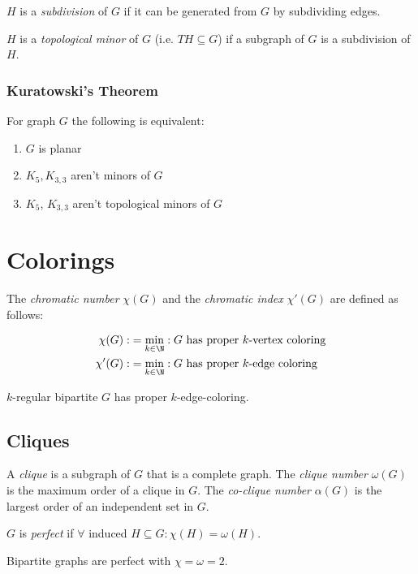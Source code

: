 $H$ is a \emph{subdivision} of $G$ if it can be generated from $G$ by subdividing edges.

$H$ is a \emph{topological minor} of $G$ (i.e. $TH \subseteq G$) if a subgraph of $G$ is a subdivision of $H$.

\subsubsection*{Kuratowski's Theorem}

For graph $G$ the following is equivalent:

\begin{enumerate}[label=(\alph*)]
	\item $G$ is planar
	\item $K_5, K_{3,3}$ aren't minors of $G$
	\item $K_5$, $K_{3,3}$ aren't topological minors of $G$
\end{enumerate}


\section*{Colorings}

The \emph{chromatic number} $\chi(G)$ and the \emph{chromatic index} $\chi'(G)$ are defined as follows:

\vspace*{-4mm}
\begin{align*}
\chi(G) :&= \min_{k \in \N} : G \text{ has proper $k$-vertex coloring} \\
\chi'(G) :&= \min_{k \in \N} : G \text{ has proper $k$-edge coloring}
\end{align*}

$k$-regular bipartite $G$ has proper $k$-edge-coloring.

\subsection*{Cliques}

A \emph{clique} is a subgraph of $G$ that is a complete graph.
The \emph{clique number} $\omega(G)$ is the maximum order of a clique in $G$.
The \emph{co-clique number} $\alpha(G)$ is the largest order of an independent set in $G$.

\spacing

$G$ is \emph{perfect} if $\forall$ induced $H \subseteq G : \chi(H) = \omega(H)$.

Bipartite graphs are perfect with $\chi = \omega = 2$.

